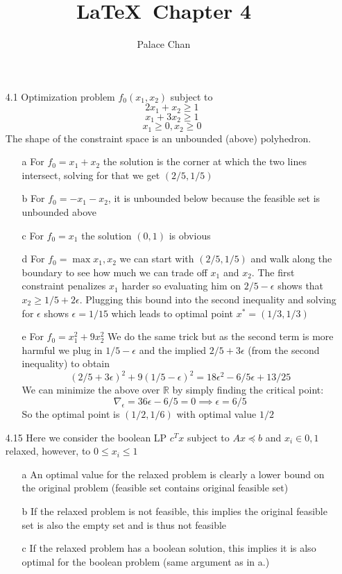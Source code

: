 \documentclass[12pt]{article}
\title{\LaTeX\ Chapter 4}
\author{Palace Chan}
\begin{document}
\maketitle
\newpage

\begin{itemize}

\item[4.1]
  Optimization problem $f_0(x_1, x_2)$ subject to
  $$ 2x_1 + x_2 \geq 1$$
  $$ x_1 + 3x_2 \geq 1$$
  $$ x_1 \geq 0, x_2 \geq 0$$    
  The shape of the constraint space is an unbounded (above) polyhedron.
  \begin{itemize}
    \item[a] For $f_0 = x_1 + x_2$  the solution is the corner at which the two lines intersect, solving for that we get $(2/5, 1/5)$
    \item[b] For $f_0 = -x_1 - x_2$, it is unbounded below because the feasible set is unbounded above
    \item[c] For $f_0 = x_1$ the solution $(0,1)$ is obvious
    \item[d] For $f_0 = \max {x_1, x_2}$ we can start with $(2/5, 1/5)$ and walk along the boundary to see how much we can trade off $x_1$ and $x_2$. The first constraint penalizes $x_1$ harder so evaluating him on $2/5 - \epsilon$ shows that $x_2 \geq 1/5 + 2 \epsilon$. Plugging this bound into the second inequality and solving for $\epsilon$ shows $\epsilon = 1/15$ which leads to optimal point $x^* = (1/3, 1/3)$
    \item[e] For $f_0 = x_1^2 + 9 x_2^2$ We do the same trick but as the second term is more harmful we plug in $1/5 - \epsilon$ and the implied $2/5 + 3 \epsilon$ (from the second inequality) to obtain
      $$(2/5 + 3 \epsilon)^2 + 9 (1/5 - \epsilon)^2 = 18 \epsilon^2 - 6/5 \epsilon + 13/25$$
      We can minimize the above over $\mathbb{R}$ by simply finding the critical point:
      $$\nabla_\epsilon = 36 \epsilon - 6/5 = 0 \implies \epsilon = 6/5$$
      So the optimal point is $(1/2, 1/6)$ with optimal value $1/2$
  \end{itemize}

\item[4.15] Here we consider the boolean LP $c^T x$ subject to $Ax \preceq b$ and $x_i \in {0,1}$ relaxed, however, to $0 \leq x_i \leq 1$
  \begin{itemize}
  \item[a] An optimal value for the relaxed problem is clearly a lower bound on the original problem (feasible set contains original feasible set)
  \item[b] If the relaxed problem is not feasible, this implies the original feasible set is also the empty set and is thus not feasible
  \item[c] If the relaxed problem has a boolean solution, this implies it is also optimal for the boolean problem (same argument as in a.)
  \end{itemize}



\end{itemize}
\end{document}
